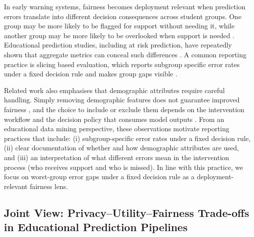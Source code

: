 \documentclass{edm_article}
\begin{document}
In early warning systems, fairness becomes deployment relevant when prediction errors translate into different decision consequences across student groups. One group may be more likely to be flagged for support without needing it, while another group may be more likely to be overlooked when support is needed \cite{18hardt2016eopp,19kleinberg2016risktradeoffs,20hlosta2022_predictive_la_errors,21Hu2020TowardsFE,22gu2022_privacy_accuracy_fairness_fl}. Educational prediction studies, including at risk prediction, have repeatedly shown that aggregate metrics can conceal such differences \cite{20hlosta2022_predictive_la_errors,21Hu2020TowardsFE,22gu2022_privacy_accuracy_fairness_fl,23gardner2019_abroca_slicing_fairness,24hutt2019evaluating-fairness-generalizability}. A common reporting practice is slicing based evaluation, which reports subgroup specific error rates under a fixed decision rule and makes group gaps visible \cite{23gardner2019_abroca_slicing_fairness,25Chung2020SliceFinder}.

Related work also emphasises that demographic attributes require careful handling. Simply removing demographic features does not guarantee improved fairness \cite{26barocas2016big-data-disparate-impact-ssrn,27dwork2012fairness-through-awareness}, and the choice to include or exclude them depends on the intervention workflow and the decision policy that consumes model outputs \cite{27dwork2012fairness-through-awareness,29baker2023demographic}. From an educational data mining perspective, these observations motivate reporting practices that include: (i) subgroup-specific error rates under a fixed decision rule, (ii) clear documentation of whether and how demographic attributes are used, and (iii) an interpretation of what different errors mean in the intervention process (who receives support and who is missed). In line with this practice, we focus on worst-group error gaps under a fixed decision rule as a deployment-relevant fairness lens.

\subsection{Joint View: Privacy--Utility--Fairness Trade-offs in Educational Prediction Pipelines}
\end{document}
